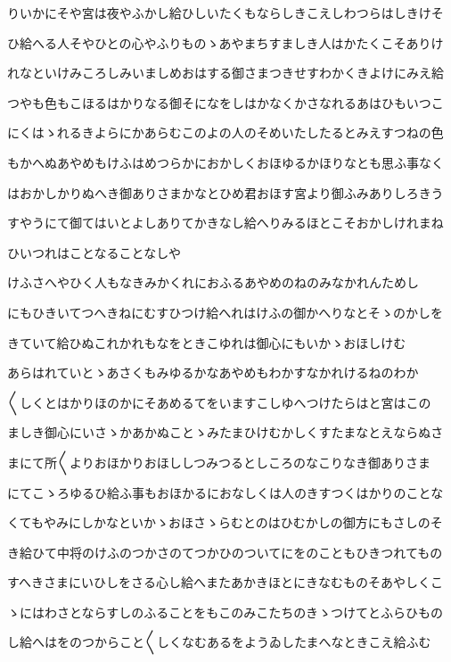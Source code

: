 \documentclass[a4paper,11pt,landscape]{ltjtarticle}
\begin{document}
りいかにそや宮は夜やふかし給ひしいたくもならしきこえしわつらはしきけそ
\par\medskip
ひ給へる人そやひとの心やふりものゝあやまちすましき人はかたくこそありけ
\par\medskip
れなといけみころしみいましめおはする御さまつきせすわかくきよけにみえ給
\par\medskip
つやも色もこほるはかりなる御そになをしはかなくかさなれるあはひもいつこ
\par\medskip
にくはゝれるきよらにかあらむこのよの人のそめいたしたるとみえすつねの色
\par\medskip
もかへぬあやめもけふはめつらかにおかしくおほゆるかほりなとも思ふ事なく
\par\medskip
はおかしかりぬへき御ありさまかなとひめ君おほす宮より御ふみありしろきう
\par\medskip
すやうにて御てはいとよしありてかきなし給へりみるほとこそおかしけれまね
\par\medskip
ひいつれはことなることなしや
\par\medskip
けふさへやひく人もなきみかくれにおふるあやめのねのみなかれんためし
\par\medskip
にもひきいてつへきねにむすひつけ給へれはけふの御かへりなとそゝのかしを
\par\medskip
きていて給ひぬこれかれもなをときこゆれは御心にもいかゝおほしけむ
\par\medskip
あらはれていとゝあさくもみゆるかなあやめもわかすなかれけるねのわか
\par\medskip
〱しくとはかりほのかにそあめるてをいますこしゆへつけたらはと宮はこの
\par\medskip
ましき御心にいさゝかあかぬことゝみたまひけむかしくすたまなとえならぬさ
\par\medskip
まにて所〱よりおほかりおほししつみつるとしころのなこりなき御ありさま
\par\medskip
にてこゝろゆるひ給ふ事もおほかるにおなしくは人のきすつくはかりのことな
\par\medskip
くてもやみにしかなといかゝおほさゝらむとのはひむかしの御方にもさしのそ
\par\medskip
き給ひて中将のけふのつかさのてつかひのついてにをのこともひきつれてもの
\par\medskip
すへきさまにいひしをさる心し給へまたあかきほとにきなむものそあやしくこ
\par\medskip
ゝにはわさとならすしのふることをもこのみこたちのきゝつけてとふらひもの
\par\medskip
し給へはをのつからこと〱しくなむあるをようゐしたまへなときこえ給ふむ
\end{document}
